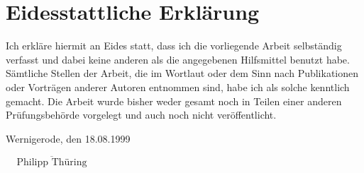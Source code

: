 
\section*{Eidesstattliche Erklärung}
\vspace{10mm}

Ich erkläre hiermit an Eides statt, dass ich die vorliegende Arbeit selbständig verfasst und dabei 
keine anderen als die angegebenen Hilfsmittel benutzt habe. Sämtliche Stellen der Arbeit, die im 
Wortlaut oder dem Sinn nach Publikationen oder Vorträgen anderer Autoren entnommen sind, habe ich 
als solche kenntlich gemacht. Die Arbeit wurde bisher weder gesamt noch in Teilen einer anderen 
Prüfungsbehörde vorgelegt und auch noch nicht veröffentlicht.

\vspace{10mm}

Wernigerode, den 18.08.1999


\begin{flushright}
    $ \overline{ ~~~~~\mbox{Philipp Thüring} ~~~~~} $ 
\end{flushright}
